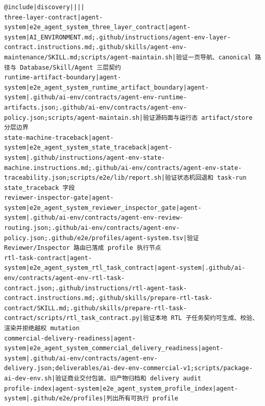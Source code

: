 \documentclass[UTF8,a4paper,zihao=-4,oneside]{ctexart}
\begin{document}
\noindent\begin{minipage}{\linewidth}
\begin{lstlisting}[language={},basicstyle=\ttfamily\zihao{6},
  caption={\texttt{agent-system.tsv} 的当前 8 行配置},
  label={code:agent-system-profile}]
@include|discovery||||
three-layer-contract|agent-system|e2e_agent_system_three_layer_contract|agent-system|AI_ENVIRONMENT.md;.github/instructions/agent-env-layer-contract.instructions.md;.github/skills/agent-env-maintenance/SKILL.md;scripts/agent-maintain.sh|验证一页导航、canonical 路径与 Database/Skill/Agent 三层契约
runtime-artifact-boundary|agent-system|e2e_agent_system_runtime_artifact_boundary|agent-system|.github/ai-env/contracts/agent-env-runtime-artifacts.json;.github/ai-env/contracts/agent-env-policy.json;scripts/agent-maintain.sh|验证源码面与运行态 artifact/store 分层边界
state-machine-traceback|agent-system|e2e_agent_system_state_traceback|agent-system|.github/instructions/agent-env-state-machine.instructions.md;.github/ai-env/contracts/agent-env-state-traceability.json;scripts/e2e/lib/report.sh|验证状态机回退和 task-run state_traceback 字段
reviewer-inspector-gate|agent-system|e2e_agent_system_reviewer_inspector_gate|agent-system|.github/ai-env/contracts/agent-env-review-routing.json;.github/ai-env/contracts/agent-env-policy.json;.github/e2e/profiles/agent-system.tsv|验证 Reviewer/Inspector 路由已落成 profile 执行节点
rtl-task-contract|agent-system|e2e_agent_system_rtl_task_contract|agent-system|.github/ai-env/contracts/agent-env-rtl-task-contract.json;.github/instructions/rtl-agent-task-contract.instructions.md;.github/skills/prepare-rtl-task-contract/SKILL.md;.github/skills/prepare-rtl-task-contract/scripts/rtl_task_contract.py|验证本地 RTL 子任务契约可生成、校验、渲染并拒绝越权 mutation
commercial-delivery-readiness|agent-system|e2e_agent_system_commercial_delivery_readiness|agent-system|.github/ai-env/contracts/agent-env-delivery.json;deliverables/ai-dev-env-commercial-v1;scripts/package-ai-dev-env.sh|验证商业交付包装、旧产物归档和 delivery audit
profile-index|agent-system|e2e_agent_system_profile_index|agent-system|.github/e2e/profiles|列出所有可执行 profile
\end{lstlisting}
\end{minipage}
\end{document}
